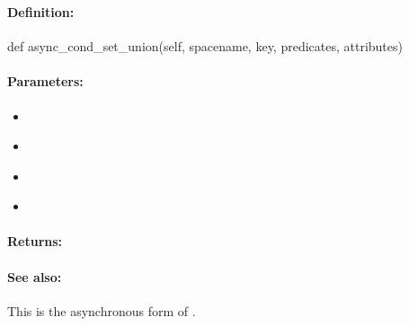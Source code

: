\pagebreak
\subsubsection{}
\label{api:python:async_cond_set_union}


\paragraph{Definition:}
\begin{pythoncode}
def async_cond_set_union(self, spacename, key, predicates, attributes)
\end{pythoncode}

\paragraph{Parameters:}
\begin{itemize}[noitemsep]
\item {}\\

\item {}\\

\item {}\\

\item {}\\

\end{itemize}

\paragraph{Returns:}


\paragraph{See also:}  This is the asynchronous form of .

\pagebreak
\subsubsection{}
\label{api:python:group_set_union}


